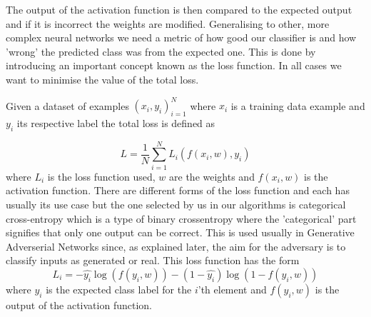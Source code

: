 \documentclass[11pt]{article} %
\begin{document}
The output of the activation function is then compared to the expected output and if it is incorrect the weights are modified.
Generalising to other, more complex neural networks we need a metric of how good our classifier is and how 'wrong' the predicted class was from the expected one.
This is done by introducing an important concept known as the loss function. In all cases we want to minimise the value of the total loss.
\newline

Given a dataset of examples $ {( {x_i} , {y_i} )}_{i=1}^N $ where ${x_i}$ is a training data example and ${y_i}$ its respective label the total loss is defined as

\begin{equation}
L = \frac{1}{N}\sum_{i=1}^{N}{L_i}(f({x_i},w),{y_i})
\label{eq:totalLoss}
\end{equation}
where ${L_i}$ is the loss function used, $w$ are the weights and $f({x_i},w)$ is the activation function. There are different forms of the loss function and each has usually its use case \cite{zhao2015loss} but the one selected by us in our algorithms is categorical cross-entropy \cite{zhang2018generalized} which is a type of binary crossentropy where the 'categorical' part signifies that only one output can be correct. This is used usually in Generative Adverserial Networks since, as explained later, the aim for the adversary is to classify inputs as generated or real. This loss function has the form
\begin{equation}
{L_i} = -\hat{y_i}\log{(f({y_i},w))} - (1-\hat{y_i})\log{(1-f({y_i},w))}
\end{equation}
where $\hat{y_i}$ is the expected class label for the $i$'th element and $f({y_i},w)$ is the output of the activation function.
\newline
\end{document}
